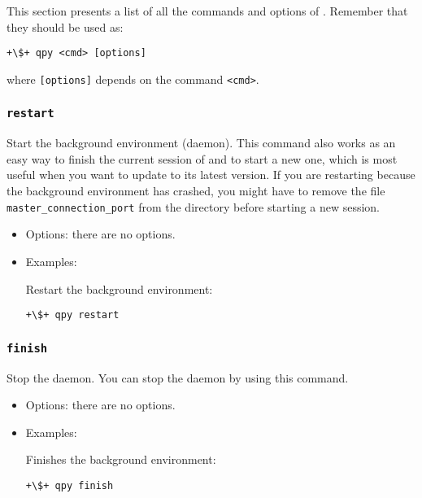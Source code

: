 \documentclass[a4paper,12pt]{article}
\begin{document}
This section presents a list of all the commands and options of \qpy{}.
Remember that they should be used as:
\begin{lstlisting}[style=BashStyle]
+\$+ qpy <cmd> [options]
\end{lstlisting}
where \texttt{[options]} depends on the command \texttt{<cmd>}.

\subsubsection{\texttt{restart}}

Start the \qpy{} background environment (daemon).
This command also works as an easy way to finish the current session of \qpy{} and to start a new one, which is most useful when you want to update  \qpy{} to its latest version.
If you are restarting \qpy{} because the background environment has crashed, you might have to remove the file \texttt{master\_connection\_port} from the \qpy{} directory before starting a new \qpy{} session. 

\begin{itemize}
\item Options:
  there are no options.

\item Examples:

  Restart the \qpy{} background environment:

\begin{lstlisting}[style=BashStyle]
+\$+ qpy restart
\end{lstlisting}
\end{itemize}  

\subsubsection{\texttt{finish}}

Stop the \qpy{} daemon.
You can stop the \qpy{} daemon by using this command.

\begin{itemize}
\item Options:
  there are no options.
  
\item Examples:
  
  Finishes the background \qpy{} environment:

\begin{lstlisting}[style=BashStyle]
+\$+ qpy finish
\end{lstlisting}
  \end{itemize}
\end{document}
